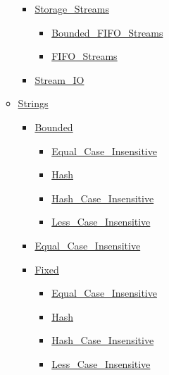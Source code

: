 \documentclass[english]{article}
\begin{document}
\begin{scriptsize}
\begin{multicols*}{5}
\begin{itemize}[leftmargin=0mm]
\begin{itemize}[leftmargin=5mm]
\begin{itemize}[leftmargin=5mm]
	\item[] \href{http://www.ada-auth.org/standards/22rm/html/RM-13-13-1.html}{Storage\_Streams}
	  \begin{itemize}[leftmargin=5mm]
	  \item[] \href{http://www.ada-auth.org/standards/22rm/html/RM-13-13-1.html}{Bounded\_FIFO\_Streams}
	  \item[] \href{http://www.ada-auth.org/standards/22rm/html/RM-13-13-1.html}{FIFO\_Streams}
	  \end{itemize}
	\item[] \href{http://www.ada-auth.org/standards/22rm/html/RM-A-12-1.html}{Stream\_IO}
	\end{itemize}
  \item[] \href{http://www.ada-auth.org/standards/22rm/html/RM-A-4-1.html}{Strings}
	\begin{itemize}[leftmargin=5mm]
	\item[] \href{http://www.ada-auth.org/standards/22rm/html/RM-A-4-4.html}{Bounded}
	  \begin{itemize}[leftmargin=5mm]
	  \item[] \href{http://www.ada-auth.org/standards/22rm/html/RM-A-4-10.html}{Equal\_Case\_Insensitive}
	  \item[] \href{http://www.ada-auth.org/standards/22rm/html/RM-A-4-9.html}{Hash}
	  \item[] \href{http://www.ada-auth.org/standards/22rm/html/RM-A-4-9.html}{Hash\_Case\_Insensitive}
	  \item[] \href{http://www.ada-auth.org/standards/22rm/html/RM-A-4-10.html}{Less\_Case\_Insensitive}
	  \end{itemize}
	\item[] \href{http://www.ada-auth.org/standards/22rm/html/RM-A-4-10.html}{Equal\_Case\_Insensitive}
	\item[] \href{http://www.ada-auth.org/standards/22rm/html/RM-A-4-3.html}{Fixed}
	  \begin{itemize}[leftmargin=5mm]
	  \item[] \href{http://www.ada-auth.org/standards/22rm/html/RM-A-4-10.html}{Equal\_Case\_Insensitive}
	  \item[] \href{http://www.ada-auth.org/standards/22rm/html/RM-A-4-9.html}{Hash}
	  \item[] \href{http://www.ada-auth.org/standards/22rm/html/RM-A-4-9.html}{Hash\_Case\_Insensitive}
	  \item[] \href{http://www.ada-auth.org/standards/22rm/html/RM-A-4-10.html}{Less\_Case\_Insensitive}

\end{itemize}
\end{itemize}
\end{itemize}
\end{itemize}
\end{multicols*}
\end{scriptsize}
\end{document}
